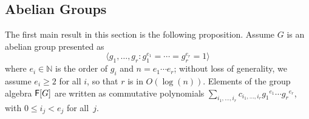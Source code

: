 

\subsection{Abelian Groups}
\label{ssec:proj_abelian}

The first main result in this section is the following proposition.
Assume $G$ is an abelian group presented as 
$$ \langle g_1, \ldots , g_r: g_{1}^{e_1} = \cdots = g_{r}^{e_r} = 1
\rangle$$ where $ e_i \in \mathbb{N}$ is the order of $g_i$ and $n =
e_1 \cdots e_r$; without loss of generality, we assume $e_i \ge 2$ for
all $i$, so that $r$ is in $O(\log(n))$. Elements of the group
algebra ${\mathsf{F}}[G]$ are written as commutative polynomials
$\sum_{i_1,\dots,i_r} c_{i_1,\dots,i_r} {g_1}^{e_1} \cdots {g_r}^{e_r}$,
with $0\le i_j < e_j$ for all~$j$.



